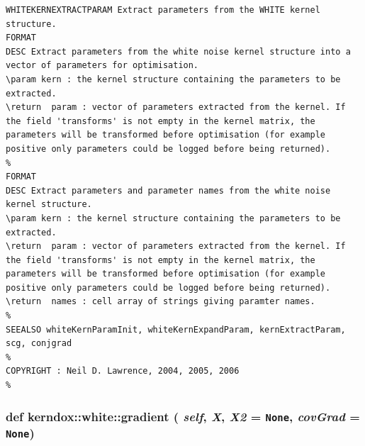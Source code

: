 \footnotesize\begin{verbatim}WHITEKERNEXTRACTPARAM Extract parameters from the WHITE kernel structure.
FORMAT
DESC Extract parameters from the white noise kernel structure into a
vector of parameters for optimisation.
\param kern : the kernel structure containing the parameters to be
extracted.
\return  param : vector of parameters extracted from the kernel. If
the field 'transforms' is not empty in the kernel matrix, the
parameters will be transformed before optimisation (for example
positive only parameters could be logged before being returned).
%
FORMAT
DESC Extract parameters and parameter names from the white noise
kernel structure.
\param kern : the kernel structure containing the parameters to be
extracted.
\return  param : vector of parameters extracted from the kernel. If
the field 'transforms' is not empty in the kernel matrix, the
parameters will be transformed before optimisation (for example
positive only parameters could be logged before being returned).
\return  names : cell array of strings giving paramter names.
%
SEEALSO whiteKernParamInit, whiteKernExpandParam, kernExtractParam, scg, conjgrad
%
COPYRIGHT : Neil D. Lawrence, 2004, 2005, 2006
%
\end{verbatim}
\normalsize
 \hypertarget{classkerndox_1_1white_21428889944fc4070648f5d36f7c30a7}{
\subsubsection[{gradient}]{\setlength{\rightskip}{0pt plus 5cm}def kerndox::white::gradient ( {\em self}, \/   {\em X}, \/   {\em X2} = {\tt None}, \/   {\em covGrad} = {\tt None})}}
\label{classkerndox_1_1white_21428889944fc4070648f5d36f7c30a7}




